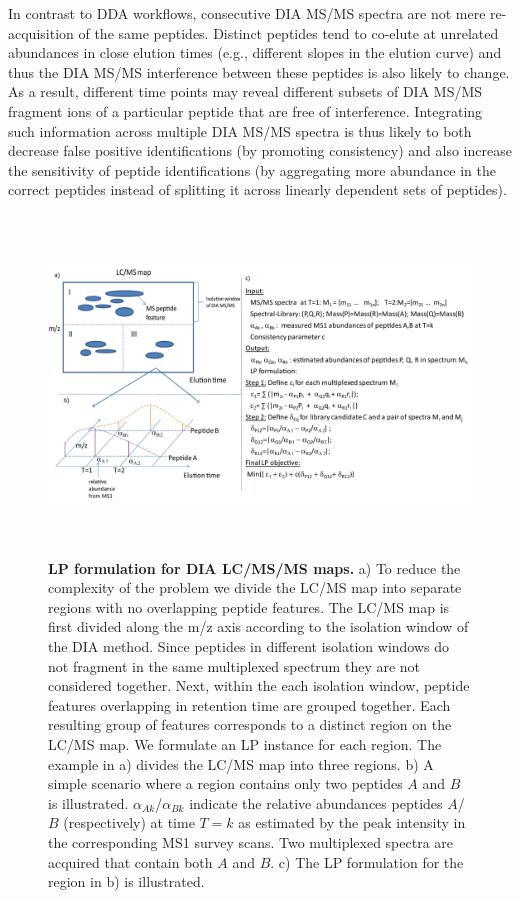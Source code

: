 \documentclass[arial,11pt]{article}
\begin{document}
In contrast to DDA workflows, consecutive DIA MS/MS spectra are not mere re-acquisition of the same peptides. Distinct peptides tend to co-elute at unrelated abundances in close elution times (e.g., different slopes in the elution curve) and thus the DIA MS/MS interference between these peptides is also likely to change. As a result, different time points may reveal different subsets of DIA MS/MS fragment ions of a particular peptide that are free of interference. Integrating such information across multiple DIA MS/MS spectra is thus likely to both decrease false positive identifications (by promoting consistency) and also increase the sensitivity of peptide identifications (by aggregating more abundance in the correct peptides instead of splitting it across linearly dependent sets of peptides).

\begin{figure}[h!]
	\centering
		\includegraphics[height=90mm, width=165mm]{./Figures/Multiplexed_2D_LP}
		\caption{\footnotesize {\bf LP formulation for DIA LC/MS/MS maps.} a) To reduce the complexity of the problem we divide the LC/MS map into separate regions with no overlapping peptide features. The LC/MS map is first divided along the m/z axis according to the isolation window of the DIA method. Since peptides in different isolation windows do not fragment in the same multiplexed spectrum they are not considered together.  Next, within the each isolation window, peptide features overlapping in retention time are grouped together. Each resulting group of features corresponds to a distinct region on the LC/MS map. We formulate an LP instance for each region.  The example in a) divides the LC/MS map into three regions.  b) A simple scenario where a region contains only two peptides $A$ and $B$ is illustrated. $\alpha_{Ak}$/$\alpha_{Bk}$ indicate the relative abundances peptides $A$/$B$ (respectively) at time $T=k$ as estimated by the peak intensity in the corresponding MS1 survey scans. Two multiplexed spectra are acquired that contain both $A$ and $B$. c) The LP formulation for the region in b) is illustrated.}
	\label{multi_LP_2D}
\end{figure}
\end{document}
